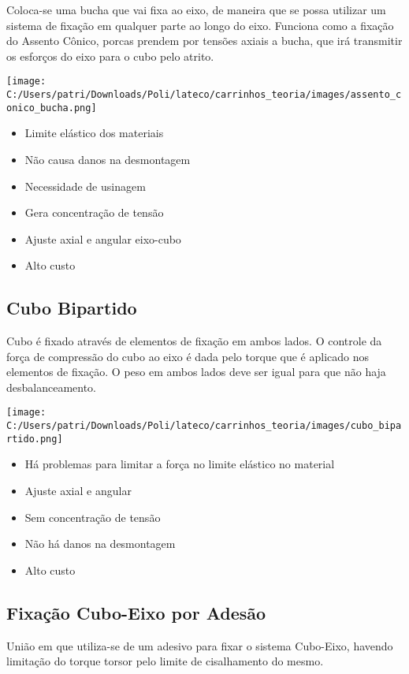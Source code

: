 Coloca-se uma bucha que vai fixa ao eixo, de maneira que se possa utilizar um sistema de fixação em qualquer parte ao longo do eixo. Funciona como a fixação do Assento Cônico, porcas prendem por tensões axiais a bucha, que irá transmitir os esforços do eixo para o cubo pelo atrito.

\texttt{[image: C:/Users/patri/Downloads/Poli/lateco/carrinhos\_teoria/images/assento\_conico\_bucha.png]}

\begin{itemize}
	\item Limite elástico dos materiais
	\item Não causa danos na desmontagem
	\item Necessidade de usinagem
	\item Gera concentração de tensão
	\item Ajuste axial e angular eixo-cubo
	\item Alto custo
\end{itemize}

\subsection{Cubo Bipartido}

Cubo é fixado através de elementos de fixação em ambos lados. O controle da força de compressão do cubo ao eixo é dada pelo torque que é aplicado nos elementos de fixação. O peso em ambos lados deve ser igual para que não haja desbalanceamento.

\texttt{[image: C:/Users/patri/Downloads/Poli/lateco/carrinhos\_teoria/images/cubo\_bipartido.png]}

\begin{itemize}
	\item Há problemas para limitar a força no limite elástico no material
	\item Ajuste axial e angular
	\item Sem concentração de tensão
	\item Não há danos na desmontagem
	\item Alto custo
\end{itemize}

\subsection{Fixação Cubo-Eixo por Adesão}

União em que utiliza-se de um adesivo para fixar o sistema Cubo-Eixo, havendo limitação do torque torsor pelo limite de cisalhamento do mesmo.

